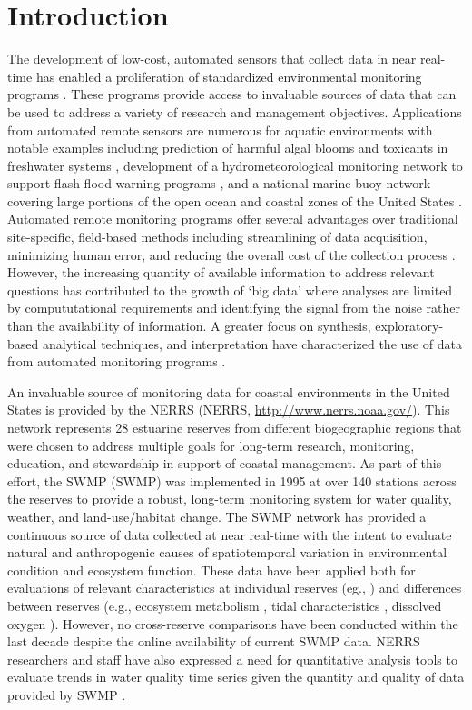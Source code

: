 \documentclass[10pt,letterpaper]{article}\usepackage[]{graphicx}\usepackage[]{color}
\begin{document}
\section*{Introduction}

The development of low-cost, automated sensors that collect data in near real-time has enabled a proliferation of standardized environmental monitoring programs \cite{Glasgow04,Fries08}.  These programs provide access to invaluable sources of data that can be used to address a variety of research and management objectives.  Applications from automated remote sensors are numerous for aquatic environments with notable examples including prediction of harmful algal blooms and toxicants in freshwater systems \cite{Reed10}, development of a hydrometeorological monitoring network to support flash flood warning programs \cite{HADS15}, and a national marine buoy network covering large portions of the open ocean and coastal zones of the United States \cite{NDBC15}.  Automated remote monitoring programs offer several advantages over traditional site-specific, field-based methods including streamlining of data acquisition, minimizing human error, and reducing the overall cost of the collection process \cite{Glasgow04}.  However, the increasing quantity of available information to address relevant questions has contributed to the growth of `big data' where analyses are limited by compututational requirements and identifying the signal from the noise rather than the availability of information. A greater focus on synthesis, exploratory-based analytical techniques, and interpretation have characterized the use of data from automated monitoring programs \cite{Campbell13,Millie13}.

An invaluable source of monitoring data for coastal environments in the United States is provided by the \acrlong{NERRS} (\acrshort{NERRS}, \url{http://www.nerrs.noaa.gov/}).  This network represents 28 estuarine reserves from different biogeographic regions that were chosen to address multiple goals for long-term research, monitoring, education, and stewardship in support of coastal management.  As part of this effort, the \acrlong{SWMP} (\acrshort{SWMP}) was implemented in 1995 at over 140 stations across the reserves to provide a robust, long-term monitoring system for water quality, weather, and land-use/habitat change.  The \gls{SWMP} network has provided a continuous source of data collected at near real-time with the intent to evaluate natural and anthropogenic causes of spatiotemporal variation in environmental condition and ecosystem function.  These data have been applied both for evaluations of relevant characteristics at individual reserves (eg., \cite{Bulthius95,Dix08}) and differences between reserves (e.g., ecosystem metabolism \cite{Caffrey03,Caffrey04}, tidal characteristics \cite{Sanger02}, dissolved oxygen \cite{Wenner04}).  However, no cross-reserve comparisons have been conducted within the last decade despite the online availability of current \gls{SWMP} data.  \gls{NERRS} researchers and staff have also expressed a need for quantitative analysis tools to evaluate trends in water quality time series given the quantity and quality of data provided by \gls{SWMP} \cite{SWMP14}.          
\end{document}
